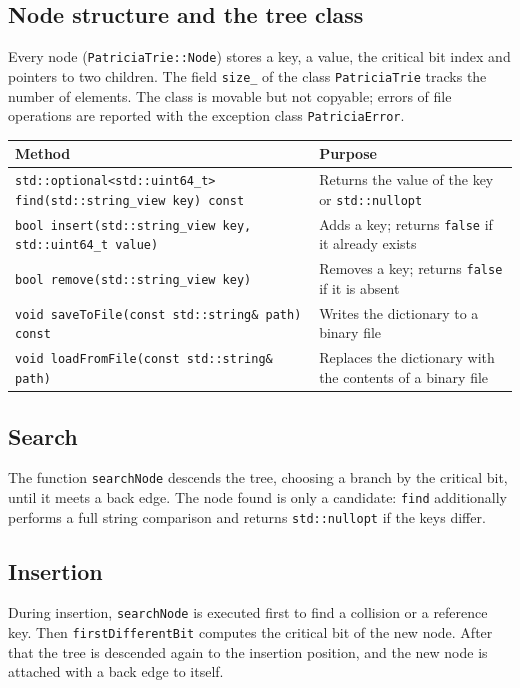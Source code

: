 \subsection{Node structure and the tree class}

Every node (\texttt{PatriciaTrie::Node}) stores a key, a value, the critical bit index and pointers
to two children. The field \texttt{size\_} of the class \texttt{PatriciaTrie} tracks the number of
elements. The class is movable but not copyable; errors of file operations are reported with the
exception class \texttt{PatriciaError}.

\begin{table}[!ht]
\centering
\begin{tabular}{|P{7.5cm}|P{7.5cm}|}
\hline
{}
Method & Purpose \\
\hline
\texttt{std::optional<std::uint64\_t> find(std::string\_view key) const} & Returns the value of
the key or \texttt{std::nullopt} \\
\hline
\texttt{bool insert(std::string\_view key, std::uint64\_t value)} & Adds a key; returns
\texttt{false} if it already exists \\
\hline
\texttt{bool remove(std::string\_view key)} & Removes a key; returns \texttt{false} if it is
absent \\
\hline
\texttt{void saveToFile(const std::string\& path) const} & Writes the dictionary to a binary file
\\
\hline
\texttt{void loadFromFile(const std::string\& path)} & Replaces the dictionary with the contents
of a binary file \\
\hline
\end{tabular}
\end{table}

\subsection{Search}

The function \texttt{searchNode} descends the tree, choosing a branch by the critical bit, until it
meets a back edge. The node found is only a candidate: \texttt{find} additionally performs a full
string comparison and returns \texttt{std::nullopt} if the keys differ.

\subsection{Insertion}

During insertion, \texttt{searchNode} is executed first to find a collision or a reference key.
Then \texttt{firstDifferentBit} computes the critical bit of the new node. After that the tree is
descended again to the insertion position, and the new node is attached with a back edge to itself.


